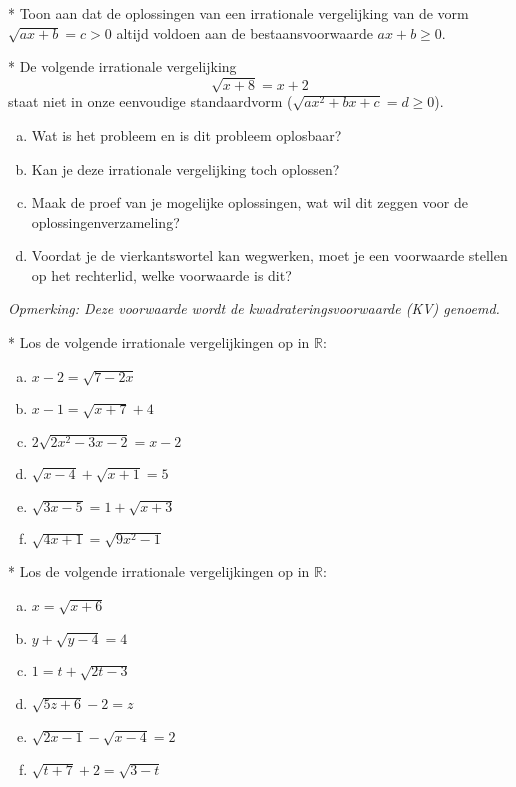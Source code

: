 \documentclass[12pt,twoside]{article}
\begin{document}
\begin{oefening}* Toon aan dat de oplossingen van een irrationale vergelijking van de vorm $\sqrt{ax+b}=c>0$ altijd voldoen aan de bestaansvoorwaarde $ax+b\geq0$.
\end{oefening}

\begin{oefening}*
De volgende irrationale vergelijking
$$\sqrt{x+8}=x+2$$
staat niet in onze eenvoudige standaardvorm ($\sqrt{ax^2+bx+c}=d\geq0$).
\begin{enumerate}[(a)]
  \item Wat is het probleem en is dit probleem oplosbaar?
  \item Kan je deze irrationale vergelijking toch oplossen?
  \item Maak de proef van je mogelijke oplossingen, wat wil dit zeggen voor de oplossingenverzameling?
  \item Voordat je de vierkantswortel kan wegwerken, moet je een voorwaarde stellen op het rechterlid, welke voorwaarde is dit?
\end{enumerate}
{\em Opmerking: Deze voorwaarde wordt de kwadrateringsvoorwaarde (KV) genoemd.}
\end{oefening}

\begin{oefening}*
Los de volgende irrationale vergelijkingen op in $\mathbb{R}$:
\begin{multicols}{2}
\begin{enumerate}[(a)]
  \item $x-2=\sqrt{7-2x}$
  \item $x-1=\sqrt{x+7}+4$
  \item $2\sqrt{2x^2-3x-2}=x-2$
  \item $\sqrt{x-4}+\sqrt{x+1}=5$
  \item $\sqrt{3x-5}=1+\sqrt{x+3}$
  \item $\sqrt{4x+1}=\sqrt{9x^2-1}$
\end{enumerate}
\end{multicols}
\end{oefening}

\begin{oefening}* %
Los de volgende irrationale vergelijkingen op in $\mathbb{R}$:
\begin{multicols}{2}
\begin{enumerate}[(a)]
  \item $x=\sqrt{x+6}$
  \item $y+\sqrt{y-4}=4$
  \item $1=t+\sqrt{2t-3}$
  \item $\sqrt{5z+6}-2=z$
  \item $\sqrt{2x-1}-\sqrt{x-4}=2$
  \item $\sqrt{t+7}+2=\sqrt{3-t}$
\end{enumerate}
\end{multicols}
\end{oefening}
\end{document}
